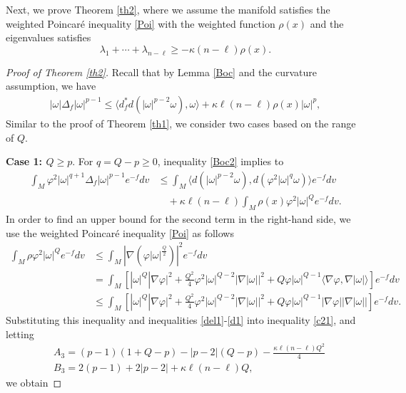 \documentclass[10pt,a4paper]{amsart}
\numberwithin{equation}{section}
\begin{document}
Next, we prove Theorem \ref{th2}, where we assume the manifold satisfies the weighted Poincar\'e inequality \eqref{Poi} with the weighted function $\rho(x)$ and the eigenvalues satisfies $$\lambda_1+\cdots+\lambda_{n-\ell}\ge -\kappa(n-\ell)\rho(x).$$	
\begin{proof}[Proof of Theorem \ref{th2}]
	Recall that by Lemma \ref{Boc} and the curvature assumption, we have
	\begin{align} \label{Boc2}
		|\omega| \Delta_f |\omega|^{p-1} \le \langle d^*_f d (|\omega|^{p-2}\omega), \omega \rangle +\kappa \ell (n-\ell) \rho(x)|\omega|^p,
	\end{align}
	Similar to the proof of Theorem \ref{th1}, we consider two cases based on the range of $Q$.
	
	\textbf{Case 1: $Q \ge p$}.  For $q=Q-p\ge 0$,	inequality \eqref{Boc2} implies to
	\begin{align} \label{c21}\nonumber
		\int_M \varphi ^2|\omega |^{q+1} \Delta_f |\omega |^{p-1}e^{-f} dv &\le 
		\int_M \langle d(|\omega|^{p-2}\omega),d(\varphi^2 |\omega|^q\omega) \rangle e^{-f}dv\\
	&	\quad+\kappa\ell(n-\ell)\int_M \rho(x)\varphi^2 |\omega
		|^{Q}e^{-f}dv.		
	\end{align}
	In order to find an upper bound for the second term in the right-hand side, we use the weighted Poincar\'e inequality \eqref{Poi} as follows
	\begin{align*}
		\int_M \rho\varphi^2 |\omega
		|^{Q}e^{-f}dv&\le   \int_M \left| \nabla \left( \varphi |\omega|^{\frac{Q}{2}} \right) \right|^2 e^{-f}dv\\ \nonumber
		&=  \int_M \left[|\omega {|^{Q}}|\nabla \varphi {|^2}  + 
		\frac{Q^2 }{4}{\varphi ^2}|\omega|^{Q-2} |\nabla |\omega |{|^2}+ 
		Q {\varphi |\omega |^{Q-1} \langle \nabla \varphi ,\nabla |\omega | \rangle }\right]e^{-f}dv\\
		&\le  \int_M \left[|\omega {|^{Q}}|\nabla \varphi {|^2}  + 
		\frac{Q^2 }{4}{\varphi ^2}|\omega|^{Q-2} |\nabla |\omega |{|^2}+ 
		Q {\varphi |\omega |^{Q-1} | \nabla \varphi| |\nabla |\omega || }\right]e^{-f}dv.	
	\end{align*}
	Substituting this inequality and inequalities \eqref{del1}-\eqref{d1} into inequality \eqref{c21}, and letting 
		\begin{align*}
		&A_3=(p-1)(1+Q-p)-|p-2|(Q-p)-\frac{\kappa \ell (n-\ell)Q^2}{4}\\
		&B_3=2(p-1)+2|p-2|+\kappa \ell (n-\ell)Q,
	\end{align*}
	we obtain

\end{proof}
\end{document}
